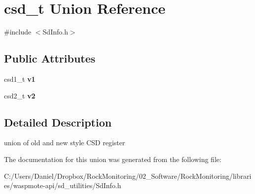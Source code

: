 \hypertarget{unioncsd__t}{}\section{csd\+\_\+t Union Reference}
\label{unioncsd__t}


{\ttfamily \#include $<$Sd\+Info.\+h$>$}

\subsection*{Public Attributes}
\begin{DoxyCompactItemize}
\item 
csd1\+\_\+t {\bfseries v1}\hypertarget{unioncsd__t_acb1d09f122f32629d8d6faa9edcc943b}{}\label{unioncsd__t_acb1d09f122f32629d8d6faa9edcc943b}

\item 
csd2\+\_\+t {\bfseries v2}\hypertarget{unioncsd__t_a19b60555856c9a485bcf4a84c248bfea}{}\label{unioncsd__t_a19b60555856c9a485bcf4a84c248bfea}

\end{DoxyCompactItemize}


\subsection{Detailed Description}
union of old and new style C\+SD register 

The documentation for this union was generated from the following file\+:\begin{DoxyCompactItemize}
\item 
C\+:/\+Users/\+Daniel/\+Dropbox/\+Rock\+Monitoring/02\+\_\+\+Software/\+Rock\+Monitoring/libraries/waspmote-\/api/sd\+\_\+utilities/Sd\+Info.\+h\end{DoxyCompactItemize}
